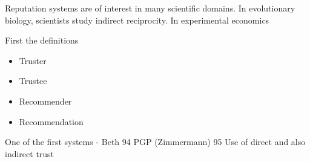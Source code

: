 
Reputation systems are of interest in many scientific domains.
In evolutionary biology, scientists study indirect reciprocity\cite{nowak2005evolution}.
In experimental economics

First the definitions
\begin{itemize}
  \item Truster
  \item Trustee
  \item Recommender
  \item Recommendation
\end{itemize}

One of the first systems - 
Beth 94\cite{beth1994valuation}
PGP (Zimmermann) 95\cite{zimmermann1995official}
Use of direct and also indirect trust


